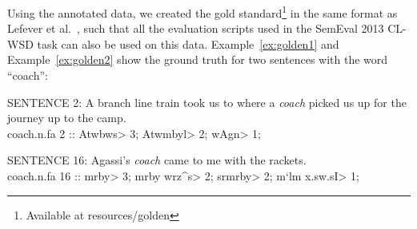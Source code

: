 Using the annotated data, we created the gold standard\footnote{Available at resources/golden} in the same format as Lefever et al.~, such that all the evaluation scripts used in the SemEval 2013 CL-WSD task can also be used on this data. Example~\ref{ex:golden1} and Example~\ref{ex:golden2} show the ground truth for two sentences with the word ``coach'':

\begin{exe}
	\ex SENTENCE 2: A branch line train took us to where a \emph{coach} picked us up for the journey up to the camp.\\
      coach.n.fa 2 :: \<Atwbws> 3; \<Atwmbyl> 2; \<wAgn> 1;
\label{ex:golden1}
\end{exe}
\begin{exe}
    \ex SENTENCE 16: Agassi's \emph{coach} came to me with the rackets.\\
        coach.n.fa 16 :: \<mrby> 3; \<mrby wrz^s> 2; \<srmrby> 2; \<m`lm x.sw.sI> 1;
\label{ex:golden2}
\end{exe}


